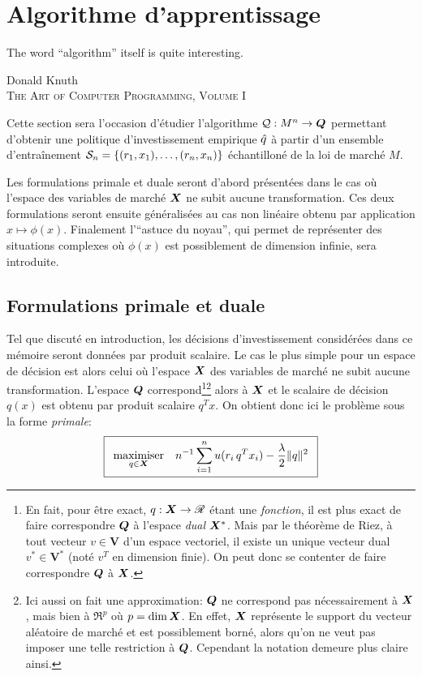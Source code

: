 \section{Algorithme d'apprentissage}
\label{sec:kernel}

\epigraph{The word ``algorithm'' itself is quite interesting.}{Donald Knuth\\\textsc{The
    Art of Computer Programming, Volume I}}


Cette section sera l'occasion d'étudier l'algorithme $\alg:M^n \to \Q$ permettant d'obtenir
une politique d'investissement empirique $\qh$ à partir d'un ensemble d'entraînement
$\S_n = \{(r_1,x_1),\ldots,(r_n,x_n)\}$ échantilloné de la loi de marché $M$.

Les formulations primale et duale seront d'abord présentées dans le cas où l'espace des
variables de marché $\X$ ne subit aucune transformation. Ces deux formulations seront
ensuite généralisées au cas non linéaire obtenu par application $x \mapsto \phi(x)$. Finalement
l'``astuce du noyau'', qui permet de représenter des situations complexes où $\phi(x)$ est
possiblement de dimension infinie, sera introduite. 


\subsection{Formulations primale et duale}

Tel que discuté en introduction, les décisions d'investissement considérées dans ce
mémoire seront données par produit scalaire. Le cas le plus simple pour un espace de
décision est alors celui où l'espace $\X$ des variables de marché ne subit aucune
transformation. L'espace $\Q$ correspond\footnote{En fait, pour être exact,
  $q : \X \to \Re$ étant une \textit{fonction}, il est plus exact de faire correspondre
  $\Q$ à l'espace \textit{dual} $\X^*$. Mais par le théorème de Riez, à tout vecteur
  $v \in \bm V$ d'un espace vectoriel, il existe un unique vecteur dual $v^* \in \bm V^*$
  (noté $v^T$ en dimension finie). On peut donc se contenter de faire correspondre $\Q$ à
  $\X$.}\footnote{Ici aussi on fait une approximation: $\Q$ ne correspond pas
  nécessairement à $\X$, mais bien à $\Re^p$ où $p = \dim\X$. En effet, $\X$ représente le
  support du vecteur aléatoire de marché et est possiblement borné, alors qu'on ne veut
  pas imposer une telle restriction à $\Q$. Cependant la notation demeure plus claire
  ainsi. } alors à $\X$ et le scalaire de décision $q(x)$ est obtenu par produit scalaire
$q^Tx$. On obtient donc ici le problème sous la forme \textit{primale}: {\begin{equation}
    \boxed{ \maximizeEquation[q\in\X]{n^{-1}\sumi u(r_i\,q^Tx_i) - \frac{\lambda}{2}\|q\|^2}}
\end{equation}
\vspace{-\baselineskip}}

